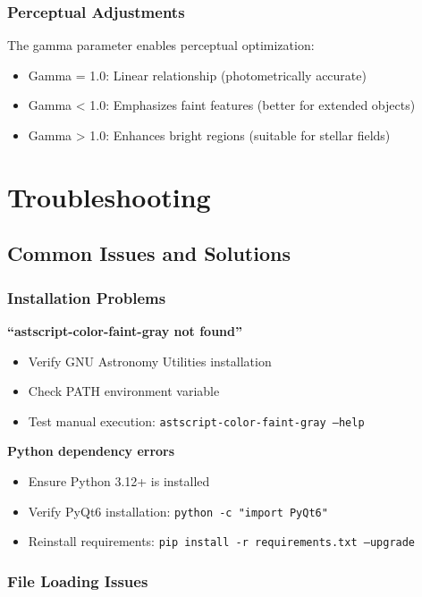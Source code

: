 \documentclass[11pt,a4paper]{article}
\begin{document}
\subsubsection{Perceptual Adjustments}

The gamma parameter enables perceptual optimization:

\begin{itemize}[leftmargin=*]
\item Gamma = 1.0: Linear relationship (photometrically accurate)
\item Gamma < 1.0: Emphasizes faint features (better for extended objects)
\item Gamma > 1.0: Enhances bright regions (suitable for stellar fields)
\end{itemize}

\section{Troubleshooting}

\subsection{Common Issues and Solutions}

\subsubsection{Installation Problems}

\textbf{``astscript-color-faint-gray not found''}
\begin{itemize}[leftmargin=*]
\item Verify GNU Astronomy Utilities installation
\item Check PATH environment variable
\item Test manual execution: \texttt{astscript-color-faint-gray --help}
\end{itemize}

\textbf{Python dependency errors}
\begin{itemize}[leftmargin=*]
\item Ensure Python 3.12+ is installed
\item Verify PyQt6 installation: \texttt{python -c "import PyQt6"}
\item Reinstall requirements: \texttt{pip install -r requirements.txt
--upgrade}
\end{itemize}

\subsubsection{File Loading Issues}
\end{document}
